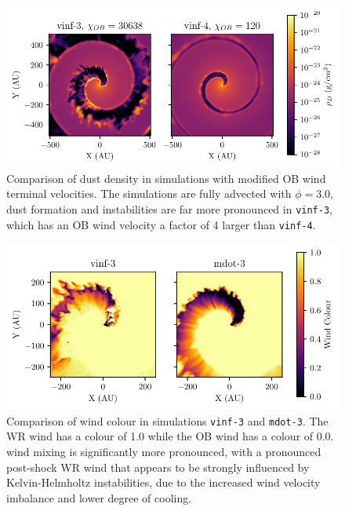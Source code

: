 




\begin{figure}
  \centering
  \includegraphics{assets/results/vinf/vinf-rhod.pdf}
  \caption[OB terminal velocity wind dust comparison]{Comparison of dust density in simulations with modified OB wind terminal velocities. The simulations are fully advected with $\phi = 3.0$, dust formation and instabilities are far more pronounced in \texttt{vinf-3}, which has an OB wind velocity a factor of 4 larger than \texttt{vinf-4}.}
  \label{fig:obvinfzcomp}
\end{figure}

\begin{figure}
  \centering
  \includegraphics{assets/results/mixed/eta-004-comparison-r0.pdf}
  \caption[Wind colour comparison of $\eta = 0.04$ winds]{Comparison of wind colour in simulations \texttt{vinf-3} and \texttt{mdot-3}. The WR wind has a colour of 1.0 while the OB wind has a colour of 0.0. wind mixing is significantly more pronounced, with a pronounced post-shock WR wind that appears to be strongly influenced by Kelvin-Helmholtz instabilities, due to the increased wind velocity imbalance and lower degree of cooling.}
  \label{fig:eta004comparisoncolour}
\end{figure}

